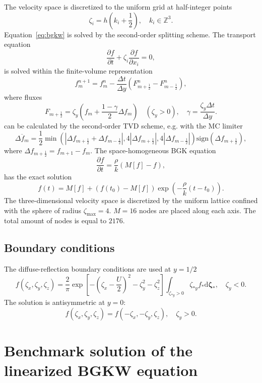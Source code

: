 \documentclass{article}
\theoremstyle{plain}
\newcommand{\dd}{\mathrm{d}}
\newcommand{\pder}[2][]{\frac{\partial#1}{\partial#2}}
\newcommand{\dzeta}{\boldsymbol{\dd\zeta}}
\begin{document}
The velocity space is discretized to the uniform grid at half-integer points
\begin{equation}\label{eq:velocity_grid}
    \zeta_i = h\left(k_i+\frac12\right), \quad k_i\in\mathbb{Z}^3.
\end{equation}
Equation~\eqref{eq:bgkw} is solved by the second-order splitting scheme.
The transport equation
\begin{equation}\label{eq:split_transport}
    \pder[f]{t} + \zeta_i\pder[f]{x_i} = 0,
\end{equation}
is solved within the finite-volume representation
\begin{equation}\label{eq:finite_volume}
    f^{n+1}_m = f^n_m - \frac{\Delta{t}}{\Delta{y}}\left(F^n_{m+\frac12}-F^n_{m-\frac12}\right),
\end{equation}
where fluxes
\begin{equation}\label{eq:fluxes}
    F_{m+\frac12} = \zeta_y\left( f_m + \frac{1-\gamma}2\Delta{f_m}\right) \quad(\zeta_y>0),
    \quad \gamma = \frac{\zeta_y\Delta{t}}{\Delta{y}}.
\end{equation}
can be calculated by the second-order TVD scheme, e.g. with the MC limiter
\begin{equation}\label{eq:MC_limiter}
    \overline{\Delta{f_m}} = \frac12\min\left(
        |\Delta f_{m+\frac12} + \Delta f_{m-\frac12}|, 4|\Delta f_{m+\frac12}|, 4|\Delta f_{m-\frac12}|
    \right)\mathrm{sign}(\Delta f_{m+\frac12}),
\end{equation}
where \(\Delta f_{m+\frac12} = f_{m+1} - f_m\).
The space-homogeneous BGK equation
\begin{equation}\label{eq:homogeneous}
    \pder[f]{t} = \frac{\rho}k (M[f]-f),
\end{equation}
has the exact solution
\begin{equation}\label{eq:exact_bgk}
    f(t) = M[f] + (f(t_0)-M[f])\exp\left(-\frac{\rho}k (t-t_0)\right).
\end{equation}
The three-dimensional velocity space is discretized by the uniform lattice confined with the sphere of radius \(\zeta_{\max}=4\).
\(M=16\) nodes are placed along each axis. The total amount of nodes is equal to \(2176\).

\subsection{Boundary conditions}

The diffuse-reflection boundary conditions are used at \(y=1/2\)
\begin{equation}\label{eq:diffuse}
    f(\zeta_x,\zeta_y,\zeta_z) = \frac2{\pi} \exp\left[-\left(\zeta_x-\frac{U}{2}\right)^2-\zeta_y^2-\zeta_z^2\right]
        \int_{\zeta_{*y}>0}\zeta_{*y} f_* \dzeta_*, \quad \zeta_y<0.
\end{equation}
The solution is antisymmetric at \(y=0\):
\begin{equation}\label{eq:antisymmetry}
    f(\zeta_x,\zeta_y,\zeta_z) = f(-\zeta_x,-\zeta_y,\zeta_z), \quad \zeta_y>0.
\end{equation}

\appendix

\section{Benchmark solution of the linearized BGKW equation}

\printbibliography
\end{document}
